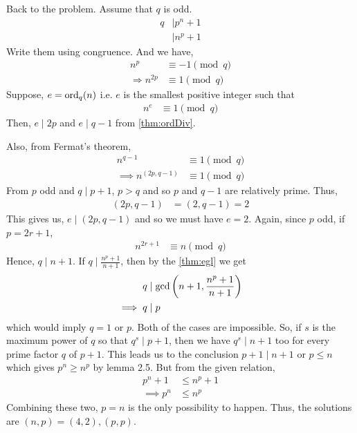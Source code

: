 \begin{solution}
	Back to the problem.
	Assume that $q$ is odd.
		\begin{align*}
			q
				& \mid p^n+1\\
				& \mid n^p+1
		\end{align*}
	Write them using congruence. And we have,
		\begin{align*}
			n^p
				& \equiv-1\pmod q\\
			\Rightarrow n^{2p}
				& \equiv1\pmod q
		\end{align*}
	Suppose, $e=\operatorname{ord}_q(n)$ i.e. $e$ is the smallest positive integer such that
		\begin{align*}
			n^e
				& \equiv1\pmod q
		\end{align*}
	Then, $e\mid 2p$ and $e\mid q-1$ from \autoref{thm:ordDiv}.

	Also, from Fermat's theorem,
		\begin{align*}
			n^{q-1}
				& \equiv1\pmod q\\
			\implies n^{(2p,q-1)}
				& \equiv1\pmod q
		\end{align*}
	From $p$ odd and $q\mid p+1$, $p>q$ and so $p$ and $q-1$ are relatively prime. Thus,
		\begin{align*}
			(2p,q-1)
				& =(2,q-1)=2
		\end{align*}
	This gives us, $e\mid (2p,q-1)$ and so we must have $e=2$. Again, since $p$ odd, if $p=2r+1$,
		\begin{align*}
			n^{2r+1}
				& \equiv n\pmod q
		\end{align*}
	Hence, $q\mid n+1$. If $q\mid \frac{n^p+1}{n+1}$, then by the \autoref{thm:egl} we get
		\begin{align*}
			q
				& \mid \gcd\left(n+1,\frac{n^p+1}{n+1}\right)\\
			\implies q
				& \mid p
		\end{align*}
	which would imply $q=1$ or $p$. Both of the cases are impossible. So, if $s$ is the maximum power of $q$ so that $q^s\mid p+1$, then we have $q^s\mid n+1$ too for every prime factor $q$ of $p+1$. This leads us to the conclusion $p+1\mid n+1$ or $p\le n$ which gives $p^n\ge n^p$ by lemma 2.5. But from the given relation,
		\begin{align*}
			p^n+1
				& \le n^p+1\\
			\implies p^n
				& \le n^p
		\end{align*}
	Combining these two, $p=n$ is the only possibility to happen. Thus, the solutions are $(n, p)=(4,2),(p, p)$.
\end{solution}

